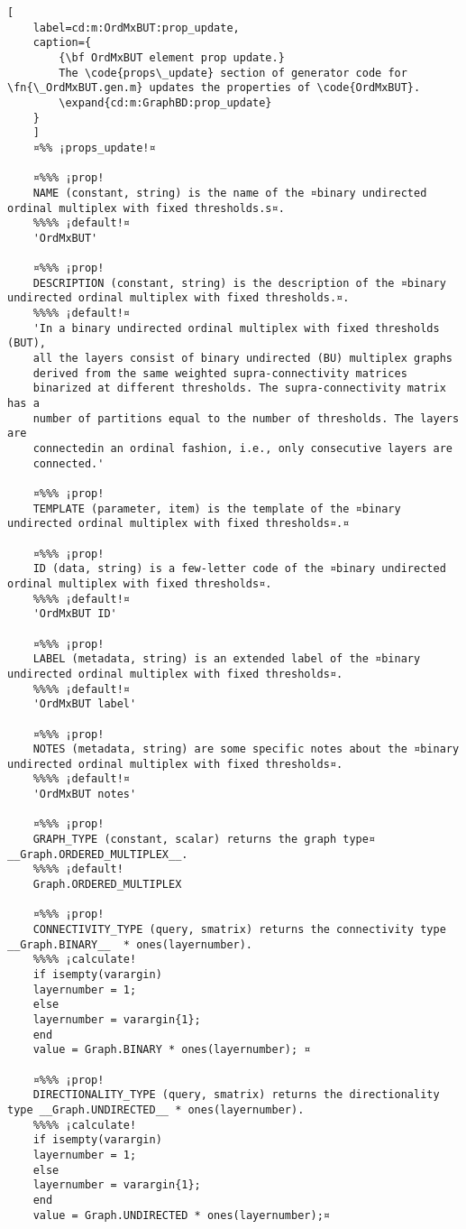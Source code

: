 \documentclass{tufte-handout}
\begin{document}
\begin{lstlisting}[
	label=cd:m:OrdMxBUT:prop_update,
	caption={
		{\bf OrdMxBUT element prop update.}
		The \code{props\_update} section of generator code for \fn{\_OrdMxBUT.gen.m} updates the properties of \code{OrdMxBUT}.
		\expand{cd:m:GraphBD:prop_update}
	}
	]
	¤%% ¡props_update!¤
	
	¤%%% ¡prop!
	NAME (constant, string) is the name of the ¤binary undirected ordinal multiplex with fixed thresholds.s¤.
	%%%% ¡default!¤
	'OrdMxBUT'
	
	¤%%% ¡prop!
	DESCRIPTION (constant, string) is the description of the ¤binary undirected ordinal multiplex with fixed thresholds.¤.
	%%%% ¡default!¤
	'In a binary undirected ordinal multiplex with fixed thresholds (BUT),
	all the layers consist of binary undirected (BU) multiplex graphs
	derived from the same weighted supra-connectivity matrices
	binarized at different thresholds. The supra-connectivity matrix has a
	number of partitions equal to the number of thresholds. The layers are
	connectedin an ordinal fashion, i.e., only consecutive layers are
	connected.'
	
	¤%%% ¡prop!
	TEMPLATE (parameter, item) is the template of the ¤binary undirected ordinal multiplex with fixed thresholds¤.¤
	
	¤%%% ¡prop!
	ID (data, string) is a few-letter code of the ¤binary undirected ordinal multiplex with fixed thresholds¤.
	%%%% ¡default!¤
	'OrdMxBUT ID'
	
	¤%%% ¡prop!
	LABEL (metadata, string) is an extended label of the ¤binary undirected ordinal multiplex with fixed thresholds¤.
	%%%% ¡default!¤
	'OrdMxBUT label'
	
	¤%%% ¡prop!
	NOTES (metadata, string) are some specific notes about the ¤binary undirected ordinal multiplex with fixed thresholds¤.
	%%%% ¡default!¤
	'OrdMxBUT notes'
	
	¤%%% ¡prop!
	GRAPH_TYPE (constant, scalar) returns the graph type¤ __Graph.ORDERED_MULTIPLEX__.
	%%%% ¡default!
	Graph.ORDERED_MULTIPLEX
	
	¤%%% ¡prop!
	CONNECTIVITY_TYPE (query, smatrix) returns the connectivity type __Graph.BINARY__  * ones(layernumber).
	%%%% ¡calculate!
	if isempty(varargin)
	layernumber = 1;
	else
	layernumber = varargin{1};
	end
	value = Graph.BINARY * ones(layernumber); ¤
	
	¤%%% ¡prop!
	DIRECTIONALITY_TYPE (query, smatrix) returns the directionality type __Graph.UNDIRECTED__ * ones(layernumber).
	%%%% ¡calculate!
	if isempty(varargin)
	layernumber = 1;
	else
	layernumber = varargin{1};
	end
	value = Graph.UNDIRECTED * ones(layernumber);¤
	

\end{lstlisting}
\end{document}
